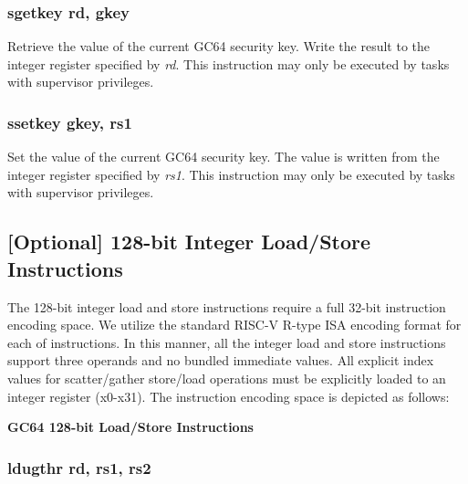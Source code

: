 \documentclass{article}
\begin{document}
\subsubsection{sgetkey rd, gkey}

Retrieve the value of the current GC64 security key.  Write
the result to the integer register specified by \emph{rd}.  This
instruction may only be executed by tasks with supervisor privileges. 

\subsubsection{ssetkey gkey, rs1}

Set the value of the current GC64 security key.  The value is written
from the integer register specified by \emph{rs1}.  This instruction
may only be executed by tasks with supervisor privileges.  

\subsection{[Optional] 128-bit Integer Load/Store Instructions}

The 128-bit integer load and store instructions require a full 32-bit instruction encoding space. We utilize the standard RISC-V R-type ISA encoding format for each of instructions. In this manner, all the integer load and store instructions support three operands and no bundled immediate values. All explicit index values for scatter/gather store/load operations must be explicitly loaded to an integer register (x0-x31).
The instruction encoding space is depicted as follows:

\begin{center}
\textbf{GC64 128-bit Load/Store Instructions}
\makebox[0.03in][s]{}\makebox[0.03in][s]{}\makebox[0.03in][s]{}\makebox[0.03in][s]{}\makebox[0.03in][s]{}
\end{center}

\subsubsection{ldugthr rd, rs1, rs2}
\end{document}
